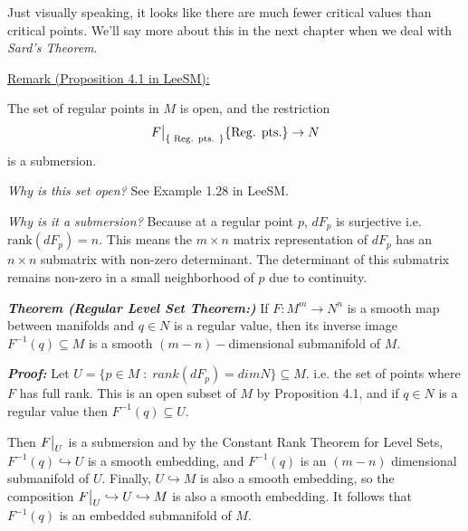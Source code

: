\documentclass{article}
\newcommand{\restr}[2]{{%
  \left.\kern-\nulldelimiterspace %
  #1 %
  \vphantom{\big|} %
  \right|_{#2} %
  }}
\begin{document}
\vskip 0.5cm
Just visually speaking, it looks like there are much fewer critical values than critical points. We'll say more about this in the next chapter when we deal with \emph{Sard's Theorem}.

\vskip 0.5cm
\begin{dottedbox}
  \underline{Remark (Proposition 4.1 in LeeSM):} 
  
  The set of regular points in $M$ is open, and the restriction \[ \restr{F}{\{\text{ {Reg. pts.} }\}} \{\text{Reg. pts.}\} \rightarrow N \] is a submersion.

  \vskip 0.25cm
  \emph{Why is this set open?}
  See Example 1.28 in LeeSM.

  \vskip 0.25cm
  \emph{Why is it a submersion?} Because at a regular point $p$, $dF_p$ is surjective i.e. $\mathrm{rank}(dF_p )= n$. This means the $m \times n$ matrix representation of $dF_p$ has an $n \times n$ submatrix with non-zero determinant. The determinant of this submatrix remains non-zero in a small neighborhood of $p$ due to continuity. 
\end{dottedbox}

\vskip 0.5cm
\begin{dottedbox}
  \emph{\textbf{Theorem (Regular Level Set Theorem:)}} If $F : M^m \rightarrow N^n$ is a smooth map between manifolds and $q \in N$ is a regular value, then its inverse image $F^{-1}(q) \subseteq M$ is a smooth $(m-n)-$dimensional submanifold of $M$.
\end{dottedbox}

\vskip 0.5cm
\emph{\textbf{Proof:}}  Let $U = \{p \in M \;:\; rank(dF_p) = dim N\} \subseteq M$. i.e. the set of points where $F$ has full rank. This is an open subset of $M$ by Proposition 4.1, and if $q \in N$ is a regular value then $F^{-1}(q) \subseteq U$.

\vskip 0.25cm
Then $\restr{F}{U}$ is a submersion and by the Constant Rank Theorem for Level Sets, $F^{-1}(q) \hookrightarrow U$ is a smooth embedding, and $F^{-1}(q)$ is an $(m-n)$ dimensional submanifold of $U$. Finally, $U \hookrightarrow M$ is also a smooth embedding, so the composition $\restr{F}{U} \hookrightarrow U \hookrightarrow M$ is also a smooth embedding. It follows that $F^{-1}(q)$ is an embedded submanifold of $M$.
\end{document}
